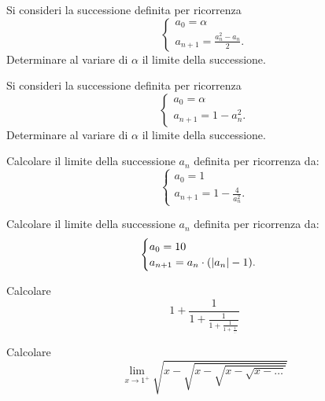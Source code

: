 \begin{exercise}
  Si consideri la successione definita per ricorrenza
  \[
  \begin{cases}
    a_0 = \alpha\\
    a_{n+1} = \frac{a_n^2-a_n}{2}.
  \end{cases}
  \]
  Determinare al variare di $\alpha$ il limite della successione.
\end{exercise}

\begin{exercise}
  Si consideri la successione definita per ricorrenza
  \[
  \begin{cases}
    a_0 = \alpha \\
    a_{n+1} = 1 - a_n^2.
  \end{cases}
  \]
  Determinare al variare di $\alpha$ il limite della successione.
\end{exercise}

\begin{exercise}
  Calcolare il limite della successione $a_n$ 
  definita per ricorrenza da:
    \[
    \begin{cases}
      a_0 = 1\\
      a_{n+1} = 1 - \frac {4}{a_n^2}.
    \end{cases}
    \]
  \end{exercise}
  
\begin{exercise}
  Calcolare il limite della successione $a_n$
  definita per ricorrenza da:
  \[
    \begin{cases}
      a_0 = 10\\
      a_{n+1} = a_n \cdot ({\left|a_n\right|}-1).
    \end{cases}
  \]
\end{exercise}
  
\begin{exercise}
Calcolare
\[
 1 + \frac{1}{1+\frac{1}{1+\frac{1}{1+\frac{1}{\dots}}}}
\]
\end{exercise}

\begin{exercise}
Calcolare
\[
  \lim_{x\to 1^+} \sqrt{x-\sqrt{x- \sqrt{x-\sqrt{x - \dots}}}}
\]
\end{exercise}

